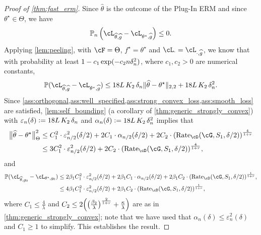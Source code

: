 \documentclass[11pt]{article} %
\newcommand{\pref}[1]{\cref{#1}}
\theoremstyle{theorem}  %
\theoremstyle{plain}
\DeclarePairedDelimiter{\prn}{(}{)}
\DeclarePairedDelimiter{\nrm}{\|}{\|}
\newcommand{\veps}{\varepsilon}
\newcommand{\ldef}{\vcentcolon=}
\newcommand{\wh}[1]{\widehat{#1}}
\newcommand{\Pn}{\ensuremath{\mathbb{P}}}
\newcommand{\estone}{\wh{g}}
\newcommand{\esttwo}{\wh{\theta}}
\newcommand{\nuisance}{\cG}
\newcommand{\target}{\Theta}
\newcommand{\dimtwo}{K_2}
\newcommand{\Rate}{\mathrm{Rate}_{\cD}}
\newcommand{\besttwo}{\theta^{\star}}
\newcommand{\gtone}{g_0}
\newcommand{\sampleone}{S_1}
\begin{document}
%
%
%
%
%
%
%
%
%
%
%
%
%
%
%
%
%
\begin{proof}[Proof of \pref{thm:fast_erm}]
Since $\esttwo$ is the outcome of the Plug-In ERM and since $\besttwo\in \target$, we have
\begin{equation*}
\Pn_n \left(\cL_{\esttwo, \estone} - \cL_{\besttwo, \estone}\right) \leq 0.
\end{equation*}
Applying \pref{lem:peeling}, with $\cF=\target$, $f^{\star}=\besttwo$
and $\cL_{\cdot} = \cL_{\cdot, \estone}$, we know that with
probability at least $1-c_1 \exp\prn{-c_2 n \delta_n^2}$, where
$c_1,c_2>0$ are numerical constants,
\begin{equation*}
\Pn (\cL_{\esttwo,\estone} - \cL_{\besttwo, \estone}) \leq 18
L\,\dimtwo\, \delta_n \|\esttwo - \besttwo\|_{2,2}
+18 L\,\dimtwo\, \delta_n^2.
\end{equation*}
%
%
%
%
%
%
%
%
%
%
%
%
Since
\pref{ass:orthogonal,ass:well_specified,ass:strong_convex_loss,ass:smooth_loss}
are satisfied, \pref{lem:self_bounding} (a corollary of
\pref{thm:generic_strongly_convex}) with $\veps_n(\delta)\ldef{}18
L\,\dimtwo\, \delta_n$ and $\alpha_n(\delta) \ldef 18 L\,\dimtwo\,
\delta_n^2$ implies that
\begin{align*}
  \nrm[\big]{\esttwo-\besttwo}_{\target}^{2} &\leq{}
C_1^2\cdot{}\veps^2_{n/2}(\delta/2) +
2C_1\cdot\alpha_{n/2}(\delta/2) + 
2C_2\cdot{}\prn*{
\Rate(\nuisance,\sampleone,\delta/2)
                                               }^{\frac{4}{1+r}}\\
                                               &\leq{}
3C_1^2\cdot{}\veps^2_{n/2}(\delta/2) +
2C_2\cdot{}\prn*{
\Rate(\nuisance,\sampleone,\delta/2)
}^{\frac{4}{1+r}},
\end{align*}
and 
\begin{align*}
\Pn (\cL_{\esttwo,\gtone} - \cL_{\besttwo, \gtone}) &\leq 
                                                      2\beta_1C_1^2\cdot{}\veps^2_{n/2}(\delta/2) +
                                                      2\beta_1C_1\cdot\alpha_{n/2}(\delta/2)
  + 
2\beta_1C_2\cdot{}\prn*{
\Rate(\nuisance,\sampleone,\delta/2)
  }^{\frac{1}{1+r}},\\
  &\leq 
    4\beta_1C_1^2\cdot{}\veps^2_{n/2}(\delta/2)
  + 
2\beta_1C_2\cdot{}\prn*{
\Rate(\nuisance,\sampleone,\delta/2)
}^{\frac{1}{1+r}},
\end{align*}
%
%
%
%
%
%
where $C_1\leq\frac{4}{\lambda}$ and
$C_2\leq2\prn[\Big]{\prn[\big]{\frac{\beta_2}{\lambda}}^{\frac{2}{1+r}}
  + \frac{\kappa}{\lambda}}$ are as in
\pref{thm:generic_strongly_convex}; note that we have used that
$\alpha_n(\delta)\leq\veps^2_n(\delta)$ and $C_1\geq{}1$ to simplify. This establishes the result.


\end{proof}
\end{document}

